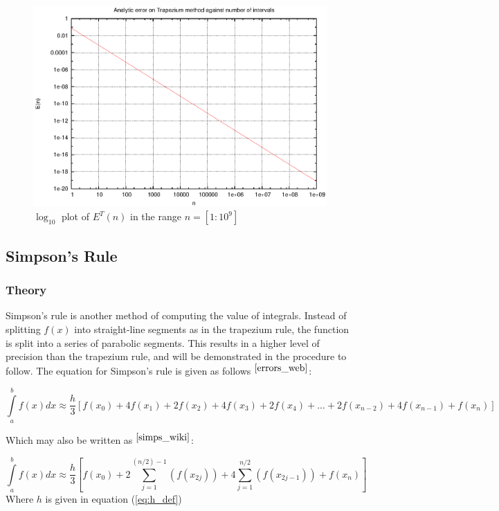 \documentclass[pdf,color]{UoBnote}
\begin{document}
				\begin{figure}[H]
					\centering
						\includegraphics{figures/q2e.eps}
					\caption{$\log_{10}$ plot of $E^T(n)$ in the range $n = [1:10^{9}]$}
					\label{fig:q2e}
				\end{figure}
	
		\subsection{Simpson's Rule}
			\subsubsection{Theory}
				Simpson's rule is another method of computing the value of integrals. Instead of splitting $f(x)$ into straight-line segments as in the trapezium rule, the function is split into a
				series of parabolic segments. This results in a higher level of precision than the trapezium rule, and will be demonstrated in the procedure to follow. The equation for Simpson's rule is given as follows $^{\cite{errors_web}}$:
				
				\begin{equation} \label{simpsons}
					\int\limits_a^b f(x) dx \approx \frac{h}{3}\left[f(x_0) + 4f(x_1) + 2f(x_2) + 4f(x_3) + 2f(x_4) + ... + 2f(x_{n-2}) + 4f(x_{n-1}) +f(x_n)\right]
				\end{equation}
				
				Which may also be written as $^{\cite{simps_wiki}}$:
				
				
				\begin{equation} \label{simpsons_sum}
					\int\limits_a^b f(x) dx \approx \frac{h}{3}\left[f(x_0) + 2 \sum\limits_{j=1}^{(n/2)-1} \left(f(x_{2j})\right) + 4 \sum\limits_{j=1}^{n/2} \left(f(x_{2j-1})\right) + f(x_n) \right]
				\end{equation}
				Where $h$ is given in equation (\ref{eq:h_def})\\\\
				
\end{document}
